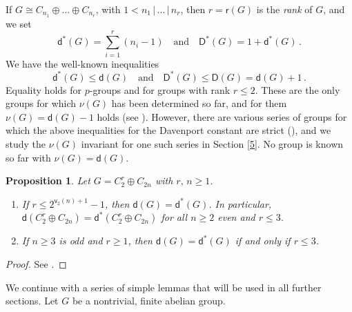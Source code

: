 \documentclass[a4paper, 10pt]{amsart}
\theoremstyle{plain}
\newtheorem{proposition}[theorem]{\bf Proposition}
\theoremstyle{definition}
\renewcommand{\t}{\, | \,}
\renewcommand{\t}{\, | \,}
\numberwithin{equation}{section}
\begin{document}
If $G \cong C_{n_1} \oplus \ldots \oplus C_{n_r}$, with $1 < n_1 \t \ldots \t n_r$, then $r=\mathsf r (G)$ is the {\it rank} of $G$, and we set
\[
\mathsf d^* (G) = \sum_{i=1}^r (n_i-1) \quad \text{and} \quad \mathsf D^* (G) = 1 + \mathsf d^* (G) \,.
\]
We have the well-known inequalities
\begin{equation} \label{davenport}
\mathsf d^* (G) \le \mathsf d (G) \quad \text{and} \quad \mathsf D^* (G) \le \mathsf D (G) = \mathsf d (G)+1 \,.
\end{equation}
Equality holds for $p$-groups and for groups with rank $r \le 2$. These are the only groups for which $\nu (G)$ has been determined so far, and for them  $\nu (G) = \mathsf d (G)-1$ holds (see \cite[Theorem 4.5.6]{Ge-Gr-Zh26a}). However, there are various series of groups for which the above inequalities for the Davenport constant are strict (\cite{Ge-Li-Ph12, Li20a, Zh23a}), and we study the $\nu (G)$ invariant for one such series in Section \ref{5}.
No group is known so far with $\nu (G) = \mathsf d (G)$.



\begin{proposition} \label{2.2}
Let $G = C_2^r \oplus C_{2n}$ with $r,\, n\geq 1$.
\begin{enumerate}
\item 
If $r \le 2^{\mathsf v_2(n)+1} - 1$, then $\mathsf d (G) = \mathsf d^* (G)$. In particular, $\mathsf d (C_2^r\oplus C_{2n})=\mathsf d^*(C_2^r\oplus C_{2n})$ for all $n\geq 2$ even and $r\leq 3$.

\item If   $n\geq 3$ is odd and $r\geq 1$, then $\mathsf d (G) = \mathsf d^* (G)$ if and only if $r \le 3$.
\end{enumerate}
\end{proposition}

\begin{proof}
See \cite[Theorems 3.9.2 and  3.9.7]{Ge-Gr-Zh26a}.
\end{proof}

We continue with a series of simple lemmas that will be used in all further sections. Let $G$ be a nontrivial, finite abelian group.
\end{document}
